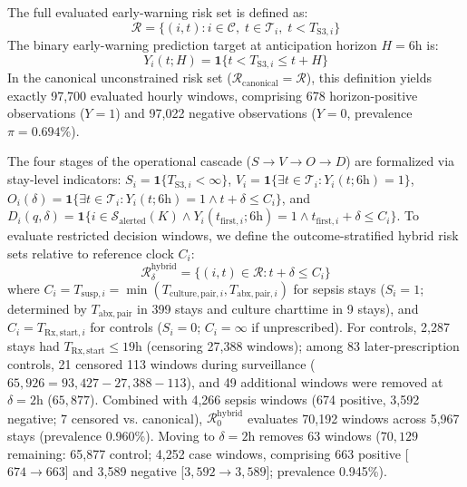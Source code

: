 \documentclass[10pt,twocolumn,a4paper]{article}
\begin{document}
The full evaluated early-warning risk set is defined as:
\begin{equation}
\mathcal{R} = \bigl\{ (i, t) : i \in \mathcal{C}, \; t \in \mathcal{T}_i, \; t < T_{\text{S3}, i} \bigr\}
\end{equation}
The binary early-warning prediction target at anticipation horizon $H = 6\text{h}$ is:
\begin{equation}
Y_i(t; H) = \mathbf{1} \bigl\{ t < T_{\text{S3}, i} \le t + H \bigr\}
\end{equation}
In the canonical unconstrained risk set ($\mathcal{R}_{\text{canonical}} = \mathcal{R}$), this definition yields exactly 97,700 evaluated hourly windows, comprising 678 horizon-positive observations ($Y=1$) and 97,022 negative observations ($Y=0$, prevalence $\pi = 0.694\%$).

The four stages of the operational cascade ($S \to V \to O \to D$) are formalized via stay-level indicators: $S_i = \mathbf{1} \{ T_{\text{S3}, i} < \infty \}$, $V_i = \mathbf{1} \{ \exists t \in \mathcal{T}_i : Y_i(t; 6\text{h}) = 1 \}$, $O_i(\delta) = \mathbf{1} \{ \exists t \in \mathcal{T}_i : Y_i(t; 6\text{h}) = 1 \land t + \delta \le C_i \}$, and $D_i(q, \delta) = \mathbf{1} \{ i \in \mathcal{S}_{\text{alerted}}(K) \land Y_i(t_{\mathrm{first}, i}; 6\text{h}) = 1 \land t_{\mathrm{first}, i} + \delta \le C_i \}$.
To evaluate restricted decision windows, we define the outcome-stratified hybrid risk sets relative to reference clock $C_i$:
\begin{equation}
\mathcal{R}_\delta^{\mathrm{hybrid}} = \bigl\{ (i, t) \in \mathcal{R} : t + \delta \le C_i \bigr\}
\end{equation}
where $C_i = T_{\mathrm{susp}, i} = \min(T_{\mathrm{culture,pair}, i}, T_{\mathrm{abx,pair}, i})$ for sepsis stays ($S_i=1$; determined by $T_{\mathrm{abx,pair}}$ in 399 stays and culture charttime in 9 stays), and $C_i = T_{\mathrm{Rx,start}, i}$ for controls ($S_i=0$; $C_i = \infty$ if unprescribed). For controls, 2,287 stays had $T_{\mathrm{Rx,start}} \le 19\text{h}$ (censoring 27,388 windows); among 83 later-prescription controls, 21 censored 113 windows during surveillance ($65,926 = 93,427 - 27,388 - 113$), and 49 additional windows were removed at $\delta=2\text{h}$ ($65,877$). Combined with 4,266 sepsis windows (674 positive, 3,592 negative; 7 censored vs. canonical), $\mathcal{R}_0^{\mathrm{hybrid}}$ evaluates 70,192 windows across 5,967 stays (prevalence 0.960\%). Moving to $\delta=2\text{h}$ removes 63 windows ($70,129$ remaining: 65,877 control; 4,252 case windows, comprising 663 positive [$674 \to 663$] and 3,589 negative [$3,592 \to 3,589$]; prevalence 0.945\%).
\end{document}
